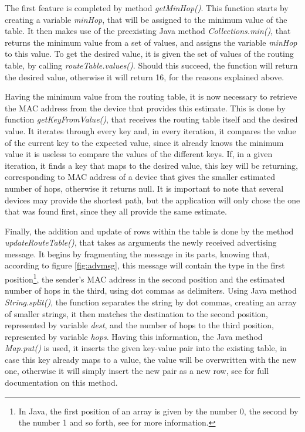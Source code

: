 The first feature is completed by method \textit{getMinHop()}. This function starts by creating a variable \textit{minHop}, that will be assigned to the minimum value of the table. It then makes use of the preexisting Java method \textit{Collections.min()}, that returns the minimum value from a set of values, and assigns the variable \textit{minHop} to this value. To get the desired value, it is given the set of values of the routing table, by calling \textit{routeTable.values()}. Should this succeed, the function will return the desired value, otherwise it will return 16, for the reasons explained above.

Having the minimum value from the routing table, it is now necessary to retrieve the \gls{MAC} address from the device that provides this estimate. This is done by function \textit{getKeyFromValue()}, that receives the routing table itself and the desired value. It iterates through every key and, in every iteration, it compares the value of the current key to the expected value, since it already knows the minimum value it is useless to compare the values of the different keys. If, in a given iteration, it finds a key that maps to the desired value, this key will be returning, corresponding to \gls{MAC} address of a device that gives the smaller estimated number of hops, otherwise it returns null. It is important to note that several devices may provide the shortest path, but the application will only chose the one that was found first, since they all provide the same estimate.

Finally, the addition and update of rows within the table is done by the method \textit{updateRouteTable()}, that takes as arguments the newly received advertising message. It begins by fragmenting the message in its parts, knowing that, according to figure \ref{fig:advmsg}, this message will contain the type in the first position\footnote{In Java, the first position of an array is given by the number 0, the second by the number 1 and so forth, see \cite{arrays} for more information.}, the sender's \gls{MAC} address in the second position and the estimated number of hops in the third, using dot commas as delimiters. Using Java method \textit{String.split()}, the function separates the string by dot commas, creating an array of smaller strings, it then matches the destination to the second position, represented by variable \textit{dest}, and the number of hops to the third position, represented by variable \textit{hops}. Having this information, the Java method \textit{Map.put()} is used, it inserts the given key-value pair into the existing table, in case this key already maps to a value, the value will be overwritten with the new one, otherwise it will simply insert the new pair as a new row, see \cite{map} for full documentation on this method. 

